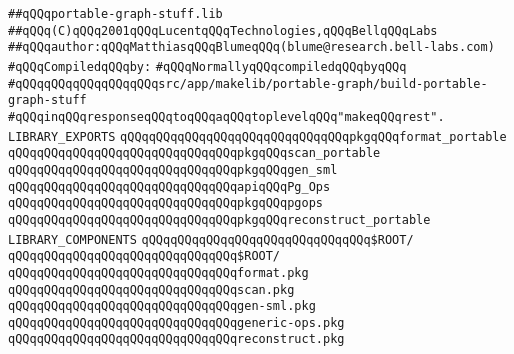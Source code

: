\label{src/app/makelib/portable-graph/portable-graph-stuff.lib}
\verb|##qQQqportable-graph-stuff.lib|\newline
\verb|##qQQq(C)qQQq2001qQQqLucentqQQqTechnologies,qQQqBellqQQqLabs|\newline
\verb|##qQQqauthor:qQQqMatthiasqQQqBlumeqQQq(blume@research.bell-labs.com)|\newline
\newline
\verb|#qQQqCompiledqQQqby:|\newline
\newline
\newline
\verb|#qQQqNormallyqQQqcompiledqQQqbyqQQq|\newline
\verb|#qQQqqQQqqQQqqQQqqQQqsrc/app/makelib/portable-graph/build-portable-graph-stuff|\newline
\verb|#qQQqinqQQqresponseqQQqtoqQQqaqQQqtoplevelqQQq"makeqQQqrest".|\newline
\newline
\newline
\newline
\newline
\verb|LIBRARY_EXPORTS|\newline
\newline
\verb|qQQqqQQqqQQqqQQqqQQqqQQqqQQqqQQqpkgqQQqformat_portable|\newline
\verb|qQQqqQQqqQQqqQQqqQQqqQQqqQQqqQQqpkgqQQqscan_portable|\newline
\verb|qQQqqQQqqQQqqQQqqQQqqQQqqQQqqQQqpkgqQQqgen_sml|\newline
\newline
\verb|qQQqqQQqqQQqqQQqqQQqqQQqqQQqqQQqapiqQQqPg_Ops|\newline
\newline
\verb|qQQqqQQqqQQqqQQqqQQqqQQqqQQqqQQqpkgqQQqpgops|\newline
\verb|qQQqqQQqqQQqqQQqqQQqqQQqqQQqqQQqpkgqQQqreconstruct_portable|\newline
\newline
\newline
\newline
\verb|LIBRARY_COMPONENTS|\newline
\newline
\verb|qQQqqQQqqQQqqQQqqQQqqQQqqQQqqQQq$ROOT/|\newline
\verb|qQQqqQQqqQQqqQQqqQQqqQQqqQQqqQQq$ROOT/|\newline
\verb|qQQqqQQqqQQqqQQqqQQqqQQqqQQqqQQqformat.pkg|\newline
\verb|qQQqqQQqqQQqqQQqqQQqqQQqqQQqqQQqscan.pkg|\newline
\verb|qQQqqQQqqQQqqQQqqQQqqQQqqQQqqQQqgen-sml.pkg|\newline
\verb|qQQqqQQqqQQqqQQqqQQqqQQqqQQqqQQqgeneric-ops.pkg|\newline
\verb|qQQqqQQqqQQqqQQqqQQqqQQqqQQqqQQqreconstruct.pkg|\newline


